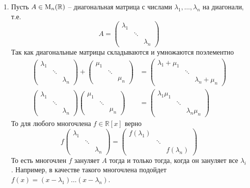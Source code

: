 \begin{enumerate}
\item Пусть $A\in\operatorname{M}_{n}(\mathbb R)$ -- диагональная матрица с числами $\lambda_1,\ldots, \lambda_n$ на диагонали, т.е.
\[
A = 
\begin{pmatrix}
{\lambda_1}&{}&{}\\
{}&{\ddots}&{}\\
{}&{}&{\lambda_n}
\end{pmatrix}
\]
Так как диагональные матрицы складываются и умножаются поэлементно
\begin{align*}
\begin{pmatrix}
{\lambda_1}&{}&{}\\
{}&{\ddots}&{}\\
{}&{}&{\lambda_n}
\end{pmatrix}
+
\begin{pmatrix}
{\mu_1}&{}&{}\\
{}&{\ddots}&{}\\
{}&{}&{\mu_n}
\end{pmatrix}
&=
\begin{pmatrix}
{\lambda_1 + \mu_1}&{}&{}\\
{}&{\ddots}&{}\\
{}&{}&{\lambda_n + \mu_n}
\end{pmatrix}\\
\begin{pmatrix}
{\lambda_1}&{}&{}\\
{}&{\ddots}&{}\\
{}&{}&{\lambda_n}
\end{pmatrix}
\begin{pmatrix}
{\mu_1}&{}&{}\\
{}&{\ddots}&{}\\
{}&{}&{\mu_n}
\end{pmatrix}
&=
\begin{pmatrix}
{\lambda_1 \mu_1}&{}&{}\\
{}&{\ddots}&{}\\
{}&{}&{\lambda_n \mu_n}
\end{pmatrix}
\end{align*}
То для любого многочлена $f\in\mathbb R[x]$ верно
\[
f
\begin{pmatrix}
{\lambda_1}&{}&{}\\
{}&{\ddots}&{}\\
{}&{}&{\lambda_n}
\end{pmatrix}
=
\begin{pmatrix}
{f(\lambda_1)}&{}&{}\\
{}&{\ddots}&{}\\
{}&{}&{f(\lambda_n)}
\end{pmatrix}
\]
То есть многочлен $f$ зануляет $A$ тогда и только тогда, когда он зануляет все $\lambda_i$.
Например, в качестве такого многочлена подойдет $f(x) = (x-\lambda_1)\ldots(x-\lambda_n)$.



\end{enumerate}
